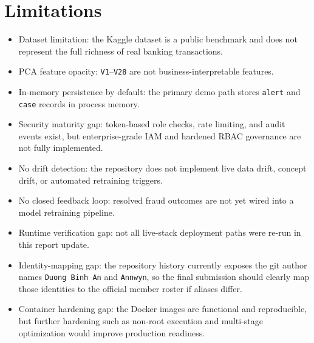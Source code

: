 \documentclass[11pt]{article}
\newcommand{\code}[1]{\texttt{#1}}
\begin{document}
\section{Limitations}
\begin{itemize}
  \item Dataset limitation: the Kaggle dataset is a public benchmark and does not represent the full richness of real banking transactions.
  \item PCA feature opacity: \code{V1}--\code{V28} are not business-interpretable features.
  \item In-memory persistence by default: the primary demo path stores \code{alert} and \code{case} records in process memory.
  \item Security maturity gap: token-based role checks, rate limiting, and audit events exist, but enterprise-grade IAM and hardened RBAC governance are not fully implemented.
  \item No drift detection: the repository does not implement live data drift, concept drift, or automated retraining triggers.
  \item No closed feedback loop: resolved fraud outcomes are not yet wired into a model retraining pipeline.
  \item Runtime verification gap: not all live-stack deployment paths were re-run in this report update.
  \item Identity-mapping gap: the repository history currently exposes the git author names \code{Duong Binh An} and \code{Annwyn}, so the final submission should clearly map those identities to the official member roster if aliases differ.
  \item Container hardening gap: the Docker images are functional and reproducible, but further hardening such as non-root execution and multi-stage optimization would improve production readiness.
\end{itemize}
\end{document}

